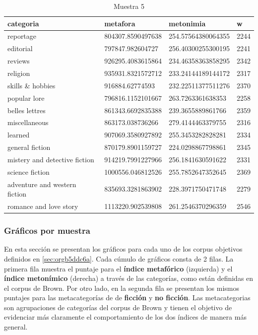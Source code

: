 \documentclass[12pt,letterpaper,twoside]{article}
\begin{document}
\begin{center}
\begin{longtable}{| p{} | p{} | p{}|p{}|}
\caption{Muestra 5}
    \hline
        categoria & metafora & metonimia & w \\ \hline
        reportage & 804307.8590497638 & 254.57564380064355 & 2244 \\ \hline
        editorial & 797847.982604727 & 256.40300255300195 & 2241 \\ \hline
        reviews & 926295.4083615864 & 234.46358363858295 & 2342 \\ \hline
        religion & 935931.8321572712 & 233.24144189144172 & 2317 \\ \hline
        skills \& hobbies & 916884.62774593 & 232.22511377511276 & 2370 \\ \hline
        popular lore & 796816.1152101667 & 263.7263361638353 & 2258 \\ \hline
        belles lettres & 861343.6692835388 & 239.3655889861766 & 2359 \\ \hline
        miscellaneous & 863173.038736266 & 279.4144463379755 & 2316 \\ \hline
        learned & 907069.3580927892 & 255.3453282828281 & 2334 \\ \hline
        general fiction & 870179.8901159727 & 224.0298867798861 & 2345 \\ \hline
        mistery and detective fiction & 914219.7991227966 & 256.1841630591622 & 2331 \\ \hline
        science fiction & 1000556.046812526 & 255.7852647352645 & 2369 \\ \hline
        adventure and western fiction & 835693.3281863902 & 228.3971750471748 & 2279 \\ \hline
        romance and love story & 1113220.902539808 & 261.2546370296359 & 2546 \\ \hline
\end{longtable}
    \label{muestra5}
\end{center}

\normalsize
\subsubsection{Gráficos por muestra}
\label{sec:org2934349}
En esta sección se presentan los gráficos para cada uno de los corpus objetivos
definidos en \ref{sec:orgb5ddc6a}. Cada cúmulo de gráficos consta de 2 filas.
La primera fila muestra el puntaje para el \textbf{índice metafórico} (izquierda) y
el \textbf{índice metonímico} (derecha) a través de las categorías, como están
definidas en el corpus de Brown. Por otro lado, en la segunda fila
se presentan los mismos puntajes para las metacategorías de de \textbf{ficción}
y \textbf{no ficción}. Las metacategorias son agrupaciones de categorías del corpus
de Brown y tienen el objetivo de evidenciar más claramente el comportamiento
de los dos índices de manera más general.
\end{document}

